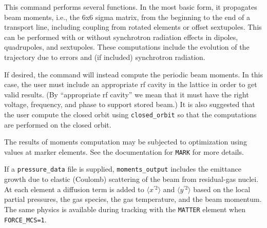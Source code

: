 \documentclass[11pt]{article}
\begin{document}
This command performs several functions.  In the most basic form, it
propagates beam moments, i.e., the 6x6 sigma matrix, from the
beginning to the end of a transport line, including coupling from
rotated elements or offset sextupoles. This can be performed with or
without synchrotron radiation effects in dipoles, quadrupoles, and sextupoles.
These computations
include the evolution of the trajectory due to errors and (if included)
synchrotron radiation.

If desired, the command will instead compute the periodic beam
moments.  In this case, the user must include an appropriate rf cavity
in the lattice in order to get valid results.  (By ``appropriate rf
cavity'' we mean that it must have the right voltage, frequency, and
phase to support stored beam.)  It is also suggested that the user
compute the closed orbit using \verb|closed_orbit| so that the
computations are performed on the closed orbit.

The results of moments computation may be subjected to optimization
using values at marker elements.  See the documentation for
\verb|MARK| for more details.

If a \verb|pressure_data| file is supplied, \verb|moments_output| includes the emittance growth
due to elastic (Coulomb) scattering of the beam from residual-gas nuclei. At each element a
diffusion term is added to $\langle x^{\prime 2}\rangle$ and $\langle y^{\prime 2}\rangle$ based on the local
partial pressures, the gas species, the gas temperature, and the beam momentum. The same physics is
available during tracking with the \verb|MATTER| element when \verb|FORCE_MCS=1|.
\end{document}
